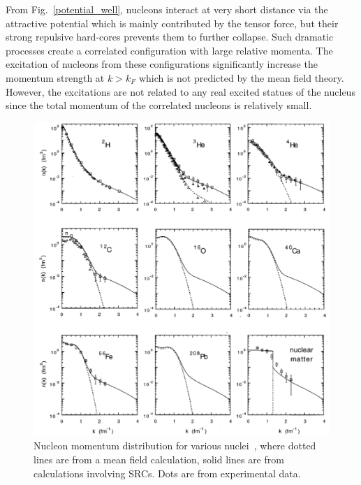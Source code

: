 From Fig.~\ref{potential_well}, nucleons interact at very short distance via the attractive potential which is mainly contributed by the tensor force, but their strong repulsive hard-cores prevents them to further collapse. Such dramatic processes create a correlated configuration with large relative momenta. The excitation of nucleons from these configurations significantly increase the momentum strength at $k>k_{F}$ which is not predicted by the mean field theory. However, the excitations are not related to any real excited statues of the nucleus since the total momentum of the correlated nucleons is relatively small. 
\begin{figure}[!ht]
  \begin{center}
    \includegraphics[type=pdf,ext=.pdf,read=.pdf,width=0.80\linewidth]{./figures/physics/Claudio_Distributions}
    \caption[Nucleon momentum distribution]{\footnotesize{Nucleon momentum distribution for various nuclei~\cite{PhysRevC.53.1689}, where dotted lines are from a mean field calculation, solid lines are from calculations involving SRCs. Dots are from experimental data.}}
    \label{mom_dis_ox}
  \end{center}
\end{figure}

